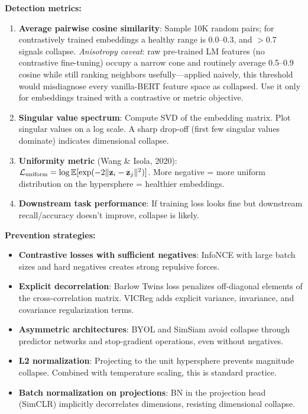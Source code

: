 \begin{interviewq}
\textbf{Detection metrics:}
\begin{enumerate}
    \item \textbf{Average pairwise cosine similarity}: Sample 10K random pairs; for contrastively trained embeddings a healthy range is 0.0--0.3, and $>$0.7 signals collapse. \textit{Anisotropy caveat}: raw pre-trained LM features (no contrastive fine-tuning) occupy a narrow cone and routinely average 0.5--0.9 cosine while still ranking neighbors usefully---applied naively, this threshold would misdiagnose every vanilla-BERT feature space as collapsed. Use it only for embeddings trained with a contrastive or metric objective.
    \item \textbf{Singular value spectrum}: Compute SVD of the embedding matrix. Plot singular values on a log scale. A sharp drop-off (first few singular values dominate) indicates dimensional collapse.
    \item \textbf{Uniformity metric} (Wang \& Isola, 2020): $\mathcal{L}_{\text{uniform}} = \log \operatorname{\mathbb{E}}[\exp(-2\|\mathbf{z}_i - \mathbf{z}_j\|^2)]$. More negative = more uniform distribution on the hypersphere = healthier embeddings.
    \item \textbf{Downstream task performance}: If training loss looks fine but downstream recall/accuracy doesn't improve, collapse is likely.
\end{enumerate}

\textbf{Prevention strategies:}
\begin{itemize}
    \item \textbf{Contrastive losses with sufficient negatives}: InfoNCE with large batch sizes and hard negatives creates strong repulsive forces.
    \item \textbf{Explicit decorrelation}: Barlow Twins loss penalizes off-diagonal elements of the cross-correlation matrix. VICReg adds explicit variance, invariance, and covariance regularization terms.
    \item \textbf{Asymmetric architectures}: BYOL and SimSiam avoid collapse through predictor networks and stop-gradient operations, even without negatives.
    \item \textbf{L2 normalization}: Projecting to the unit hypersphere prevents magnitude collapse. Combined with temperature scaling, this is standard practice.
    \item \textbf{Batch normalization on projections}: BN in the projection head (SimCLR) implicitly decorrelates dimensions, resisting dimensional collapse.
\end{itemize}


\end{interviewq}
